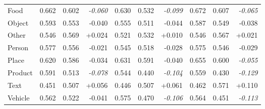 \begin{table}[ht]
\begin{tabular}{lrrr rrr rrr}
Food & 0.662 & 0.602 & \textit{-0.060} & 0.630 & 0.532 & \textit{-0.099} & 0.672 & 0.607 & \textit{-0.065} \\
Object & 0.593 & 0.553 & -0.040 & 0.555 & 0.511 & -0.044 & 0.587 & 0.549 & -0.038 \\
Other & 0.546 & 0.569 & +0.024 & 0.521 & 0.532 & +0.010 & 0.546 & 0.567 & +0.021 \\
Person & 0.577 & 0.556 & -0.021 & 0.545 & 0.518 & -0.028 & 0.575 & 0.546 & -0.029 \\
Place & 0.620 & 0.586 & -0.034 & 0.631 & 0.591 & -0.040 & 0.655 & 0.600 & \textit{-0.055} \\
Product & 0.591 & 0.513 & \textit{-0.078} & 0.544 & 0.440 & \textit{-0.104} & 0.559 & 0.430 & \textit{-0.129} \\
Text & 0.451 & 0.507 & +0.056 & 0.446 & 0.507 & +0.061 & 0.462 & 0.571 & +0.110 \\
Vehicle & 0.562 & 0.522 & -0.041 & 0.575 & 0.470 & \textit{-0.106} & 0.564 & 0.451 & \textit{-0.113} \\
\bottomrule
\end{tabular}
\end{table}
